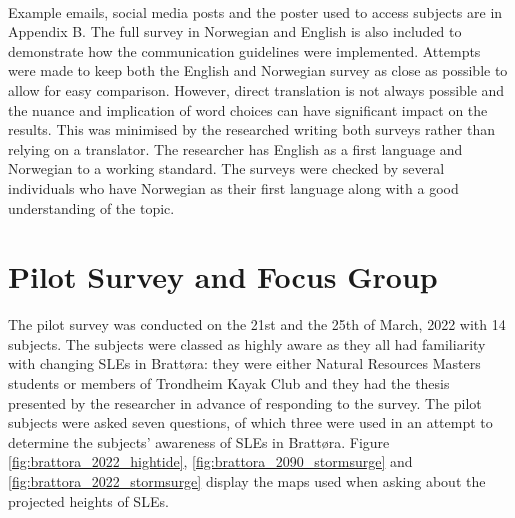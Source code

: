 \paragraph{}
Example emails, social media posts and the poster used to access subjects are in Appendix B. The full survey in Norwegian and English is also included to demonstrate how the communication guidelines were implemented. Attempts were made to keep both the English and Norwegian survey as close as possible to allow for easy comparison. However, direct translation is not always possible and the nuance and implication of word choices can have significant impact on the results. This was minimised by the researched writing both surveys rather than relying on a translator. The researcher has English as a first language and Norwegian to a working standard. The surveys were checked by several individuals who have Norwegian as their first language along with a good understanding of the topic.


\section{Pilot Survey and Focus Group}

The pilot survey was conducted on the 21st and the 25th of March, 2022 with 14 subjects. The subjects were classed as highly aware as they all had familiarity with changing SLEs in Brattøra: they were either Natural Resources Masters students or members of Trondheim Kayak Club and they had the thesis presented by the researcher in advance of responding to the survey. The pilot subjects were asked seven questions, of which three were used in an attempt to determine the subjects' awareness of SLEs in Brattøra. Figure \ref{fig:brattora_2022_hightide}, \ref{fig:brattora_2090_stormsurge} and \ref{fig:brattora_2022_stormsurge} display the maps used when asking about the projected heights of SLEs.

